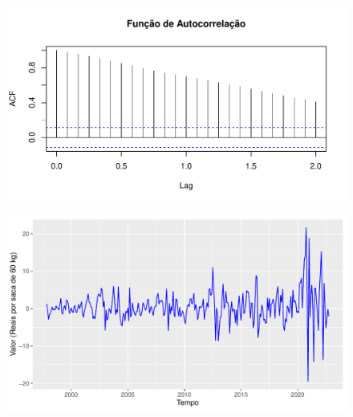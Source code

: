 \documentclass[
	12pt,				%
	openright,			%
	oneside,      %
	a4paper,			%
	english,			%
	french,				%
	spanish,			%
	brazil,				%
	]{abntex2}\usepackage[]{graphicx}\usepackage[table]{xcolor}
\makeatletter
\def\maxwidth{ %
  \ifdim\Gin@nat@width>\linewidth
    \linewidth
  \else
    \Gin@nat@width
  \fi
}
\newenvironment{knitrout}{}{} %
\theoremstyle{definition}
\theoremstyle{remark}
\makeatother
\begin{document}
\begin{knitrout}
\color{fgcolor}\begin{figure}
\includegraphics[width=\maxwidth]{figure/script4-1} \end{figure}

\end{knitrout}





\begin{knitrout}
\color{fgcolor}\begin{figure}
\includegraphics[width=\maxwidth]{figure/script5-1} \end{figure}

\end{knitrout}
\end{document}
